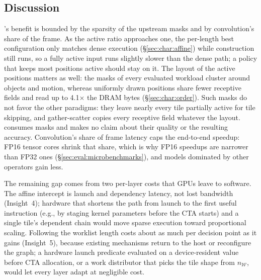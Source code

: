 \subsection{Discussion}
\label{sec:eval:discussion}

\sysname's benefit is bounded by the sparsity of the upstream masks and by
convolution's share of the frame. As the active ratio approaches one, the
per-length best configuration only matches dense execution
(\S\ref{sec:char:affine}) while construction still runs, so a fully active
input runs slightly slower than the dense path; a policy that keeps most
positions active should stay on it. The layout of the active positions
matters as well: the masks of every evaluated workload cluster around objects
and motion, whereas uniformly drawn positions share fewer receptive fields and
read up to 4.1$\times$ the DRAM bytes (\S\ref{sec:char:order}). Such masks do
not favor the other paradigms: they leave nearly every tile partially active
for tile skipping, and gather-scatter copies every receptive field whatever
the layout. \sysname consumes masks and makes no claim
about their quality or the resulting accuracy. Convolution's share of frame
latency caps the end-to-end speedup: FP16 tensor cores shrink that share,
which is why FP16 speedups are narrower than FP32 ones
(\S\ref{sec:eval:microbenchmarks}), and models dominated by other operators
gain less.

The remaining gap comes from two per-layer costs that GPUs leave to software. The affine intercept is launch and dependency latency, not lost
bandwidth (Insight~4); hardware that shortens the path from launch to the
first useful instruction (e.g., by staging kernel parameters before the CTA starts) and a single tile's dependent chain would move sparse execution toward proportional scaling. Following the worklist length costs about as
much per decision point as it gains (Insight~5), because existing mechanisms return to the host or reconfigure the graph; a hardware launch
predicate evaluated on a device-resident value before CTA allocation, or a work distributor that picks the tile shape from $n_{\mathcal{W}}$, would let
every layer adapt at negligible cost.
